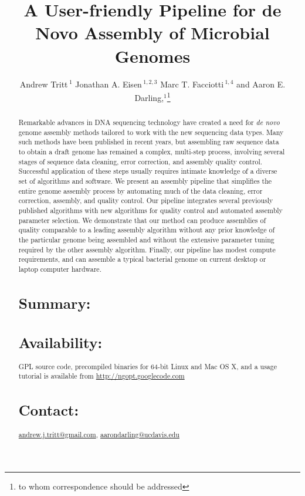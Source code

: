 \documentclass{bioinfo}
\begin{document}

\title[a5]{A User-friendly Pipeline for de Novo Assembly of Microbial Genomes}
\author[Tritt \textit{et~al}]{Andrew Tritt\,$^{1}$ Jonathan A. Eisen\,$^{1,2,3}$ Marc T. Facciotti\,$^{1,4}$ and Aaron E. Darling,$^{1}$\footnote{to whom correspondence should be addressed}}
\address{$^{1}$Genome Center, $^{2}$ Dept. of Evolution and Ecology, $^{3}$ Medical Microbiology and Immunology, 
$^{4}$ Biomedical Engineering, University of California-Davis, Davis, CA 95616.}



\maketitle

\begin{abstract}
Remarkable advances in DNA sequencing technology have created a need for \textit{de novo} genome assembly methods
tailored to work with the new sequencing data types. Many such methods have been published in recent years, but assembling
raw sequence data to obtain a draft genome has remained a complex, multi-step process, 
involving several stages of sequence data cleaning, error correction, and assembly quality control. 
Successful application of these steps usually requires intimate knowledge of a diverse set of algorithms and software. 
We present an assembly pipeline that simplifies the entire genome assembly process by automating much of the
data cleaning, error correction, assembly, and quality control. Our pipeline integrates several previously published
algorithms with new algorithms for quality control and automated assembly parameter selection.
We demonstrate that our method can produce assemblies of quality comparable to a leading assembly algorithm without
any prior knowledge of the particular genome being assembled and without the extensive parameter tuning required
by the other assembly algorithm. Finally, our pipeline has modest compute requirements, and can assemble 
a typical bacterial genome on current desktop or laptop computer hardware.

\section{Summary:}
\section{Availability:}
GPL source code, precompiled binaries for 64-bit Linux and Mac OS X, and a usage tutorial is available from \href{http://ngopt.googlecode.com}{http://ngopt.googlecode.com}

\section{Contact:} \href{mailto:andrew.j.tritt@gmail.com}{andrew.j.tritt@gmail.com}, \href{mailto:aarondarling@ucdavis.edu}{aarondarling@ucdavis.edu}
\end{abstract}
\end{document}
